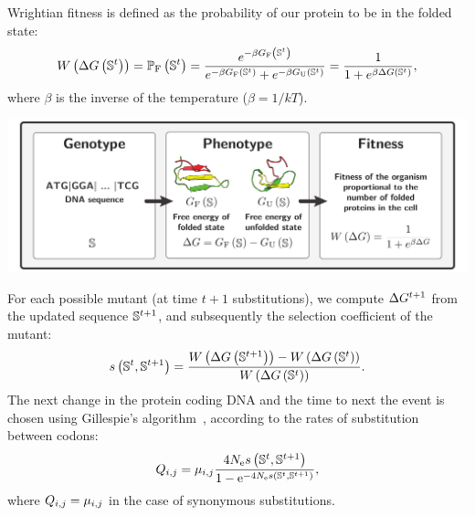 \documentclass{article}
\begin{document}
	Wrightian fitness is defined as the probability of our protein to be in the folded state:
	\begin{equation}
		W \left( \Delta G\left(\mathbb{S}^{t}\right) \right) = \mathbb{P}_{\text{F}} \left(\mathbb{S}^{t}\right) = \dfrac{e^{-\beta G_{\text{F}} \left(\mathbb{S}^{t}\right) }}{e^{-\beta G_{\text{F}}  \left(\mathbb{S}^{t}\right) } + e^{-\beta G_{\text{U}} \left(\mathbb{S}^{t}\right) }} = \dfrac{1}{1 + e^{\beta \Delta G\left(\mathbb{S}^{t}\right) }},
	\end{equation}
	where $\beta$ is the inverse of the temperature ($\beta=1/kT$).
	\begin{center}
		\includegraphics[width=\textwidth] {ModelSimuFold}
	\end{center}
	For each possible mutant (at time $t+1$ substitutions), we compute $\Delta G^{t+1}$ from the updated sequence $\mathbb{S}^{t+1}$, and subsequently the selection coefficient of the mutant:
	\begin{equation}
		s \left( \mathbb{S}^{t},\mathbb{S}^{t+1}\right) = \dfrac{W\left( \Delta G\left(\mathbb{S}^{t+1}\right) \right) -W\left( \Delta G\left(\mathbb{S}^{t}\right) \right)}{W\left( \Delta G\left(\mathbb{S}^{t}\right) \right)}.
	\end{equation}
	The next change in the protein coding {DNA} and the time to next the event is chosen using Gillespie's algorithm~\citep{Gillespie1977}, according to the rates of {substitution} between codons:
	\begin{equation}
	{Q_{{i}, {j}}}
		= \mu_{{i}, {j}} \dfrac{4 N_{\text{e}} s \left( \mathbb{S}^{t},\mathbb{S}^{t+1}\right)}{{1 - \text{e}^{-4 N_{\text{e}} s \left( \mathbb{S}^{t},\mathbb{S}^{t+1}\right)} }},
	\end{equation}
	where ${Q_{{i}, {j}}} = \mu_{{i}, {j}}$ in the case of {synonymous} substitutions.
\end{document}
